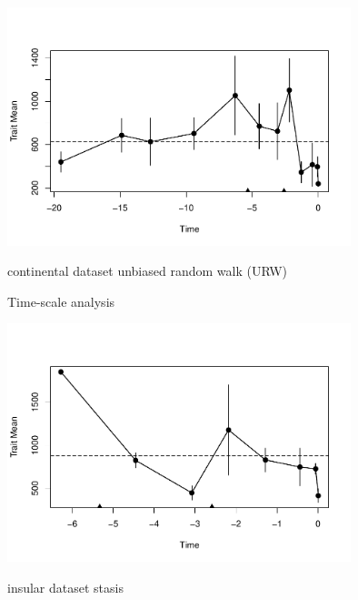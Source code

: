 \begin{frame}
\begin{center}
	\includegraphics[width=0.75\textwidth]{MA_JJ_files/figure-latex/paleoTSC-1.pdf}
\end{center}
continental dataset \pf unbiased random walk (URW)
\end{frame}

\begin{frame}{Time-scale analysis}
\begin{center}
	\includegraphics[width=0.75\textwidth]{MA_JJ_files/figure-latex/paleoTSI-1.pdf}
\end{center}
insular dataset \pf stasis
\end{frame}

